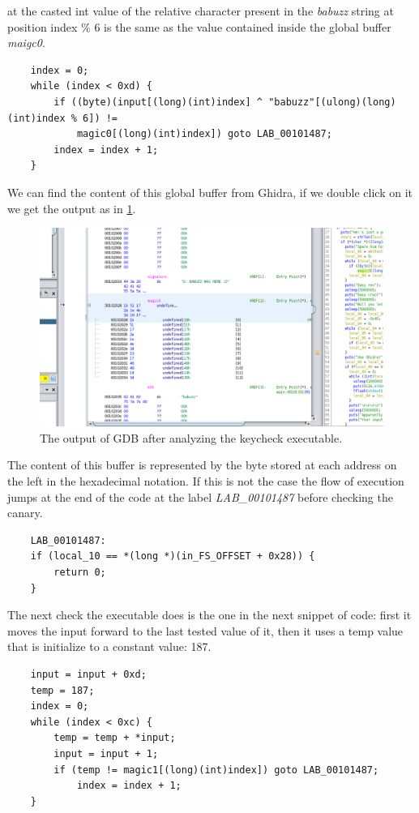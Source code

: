 \documentclass{article}
\begin{document}
at the casted int value of the relative character present in the \textit{babuzz} string at position index \% 6 is the same as the value contained inside the global buffer \textit{maigc0}.
\begin{verbatim}
    index = 0;
    while (index < 0xd) {
        if ((byte)(input[(long)(int)index] ^ "babuzz"[(ulong)(long)(int)index % 6]) !=
            magic0[(long)(int)index]) goto LAB_00101487;
        index = index + 1;
    }
\end{verbatim}
We can find the content of this global buffer from Ghidra, if we double click on it we get the output as in \ref{fig:magic0}.
\begin{figure}[htp]
    \centering
    \includegraphics[width=1\textwidth]{images/ghidramagic0.png}
    \caption{The output of GDB after analyzing the keycheck executable.}
    \label{fig:magic0}
\end{figure}
The content of this buffer is represented by the byte stored at each address on the left in the hexadecimal notation.
If this is not the case the flow of execution jumps at the end of the code at the label \textit{LAB\_00101487} before checking the canary.
\begin{verbatim}
    LAB_00101487:
    if (local_10 == *(long *)(in_FS_OFFSET + 0x28)) {
        return 0;
    }
\end{verbatim}
The next check the executable does is the one in the next snippet of code: first it moves the input forward to the last tested value of it, then it uses a temp value that is initialize to a constant value: 187.
\begin{verbatim}
    input = input + 0xd;
    temp = 187;
    index = 0;
    while (index < 0xc) {
        temp = temp + *input;
        input = input + 1;
        if (temp != magic1[(long)(int)index]) goto LAB_00101487;
            index = index + 1;
    }
\end{verbatim}
\end{document}
